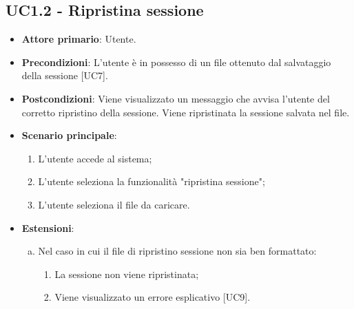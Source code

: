 \subsection{UC1.2 - Ripristina sessione}

\begin{itemize}
	\item \textbf{Attore primario}: Utente.
	\item \textbf{Precondizioni}: L'utente è in possesso di un file  ottenuto dal salvataggio della sessione [UC7].
	\item \textbf{Postcondizioni}: Viene visualizzato un messaggio che avvisa l'utente del corretto ripristino della sessione. Viene ripristinata la sessione salvata nel file.
	\item \textbf{Scenario principale}:
		\begin{enumerate}
			\item L'utente accede al sistema;
			\item L'utente seleziona la funzionalità "ripristina sessione";
			\item L'utente seleziona il file da caricare.
		\end{enumerate}
	\item \textbf{Estensioni}:
	\begin{enumerate}[(a)]
		\item Nel caso in cui il file di ripristino sessione non sia ben formattato:
		\begin{enumerate}[1.]
			\item La sessione non viene ripristinata;
			\item Viene visualizzato un errore esplicativo [UC9].
		\end{enumerate}
	\end{enumerate}
\end{itemize}

